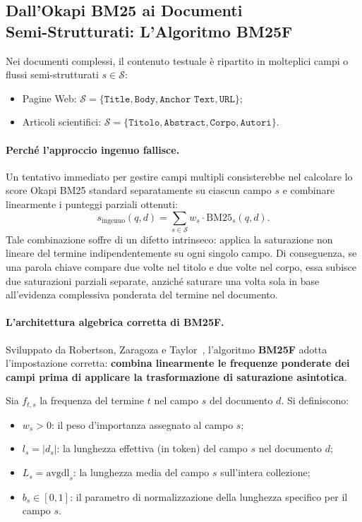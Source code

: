 \FloatBarrier
\subsection[Dall'Okapi BM25 ai Documenti Semi-Strutturati]{Dall'Okapi BM25 ai Documenti\\ Semi-Strutturati: L'Algoritmo BM25F}
\label{subsec:fondamenti-bm25f}

Nei documenti complessi, il contenuto testuale \`e ripartito in molteplici campi o flussi semi-strutturati $s \in \mathcal{S}$:
\begin{itemize}
    \item Pagine Web: $\mathcal{S} = \{\texttt{Title}, \texttt{Body}, \texttt{Anchor Text}, \texttt{URL}\}$;
    \item Articoli scientifici: $\mathcal{S} = \{\texttt{Titolo}, \texttt{Abstract}, \texttt{Corpo}, \texttt{Autori}\}$.
\end{itemize}

\paragraph{Perch\'e l'approccio ingenuo fallisce.}
Un tentativo immediato per gestire campi multipli consisterebbe nel calcolare lo score Okapi BM25 standard separatamente su ciascun campo $s$ e combinare linearmente i punteggi parziali ottenuti:
\begin{equation}
    s_{\text{ingenuo}}(q, d) = \sum_{s \in \mathcal{S}} w_s \cdot \text{BM25}_s(q, d).
\end{equation}
Tale combinazione soffre di un difetto intrinseco: applica la saturazione non lineare del termine indipendentemente su ogni singolo campo. Di conseguenza, se una parola chiave compare due volte nel titolo e due volte nel corpo, essa subisce due saturazioni parziali separate, anzich\'e saturare una volta sola in base all'evidenza complessiva ponderata del termine nel documento.

\paragraph{L'architettura algebrica corretta di BM25F.}
Sviluppato da Robertson, Zaragoza e Taylor~\cite{robertson2009,taylor2006}, l'algoritmo \textbf{BM25F} adotta l'impostazione corretta: \textbf{combina linearmente le frequenze ponderate dei campi prima di applicare la trasformazione di saturazione asintotica}.

Sia $f_{t, s}$ la frequenza del termine $t$ nel campo $s$ del documento $d$. Si definiscono:
\begin{itemize}
    \item $w_s > 0$: il peso d'importanza assegnato al campo $s$;
    \item $l_s = |d_s|$: la lunghezza effettiva (in token) del campo $s$ nel documento $d$;
    \item $L_s = \text{avgdl}_s$: la lunghezza media del campo $s$ sull'intera collezione;
    \item $b_s \in [0, 1]$: il parametro di normalizzazione della lunghezza specifico per il campo $s$.
\end{itemize}

